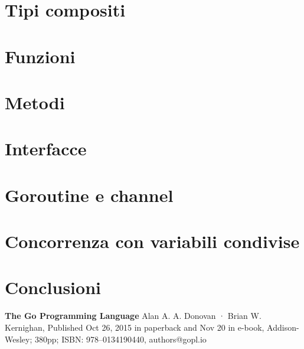 \documentclass{Configuration_Files/UniBs_thesis}
\begin{document}
    \chapter{Tipi compositi}
    \label{ch:tipi_compositi}%
    


    \chapter{Funzioni}
    \label{ch:funzioni}%
    


    \chapter{Metodi}
    \label{ch:metodi}%
    


    \chapter{Interfacce}
    \label{ch:interfacce}%
    


    \chapter{Goroutine e channel}
    \label{ch:goroutine_e_channel}%
    


    \chapter{Concorrenza con variabili condivise}
    \label{ch:concorrenza_con_variabili_condivise}%
    


    \chapter{Conclusioni}
    \label{ch:conclusioni}%
    
    \begin{thebibliography}{100}
         \textbf{The Go Programming Language} Alan A. A. Donovan · Brian W. Kernighan, Published Oct 26, 2015 in paperback and Nov 20 in e-book, Addison-Wesley;
        380pp;
        ISBN: 978--0134190440, authors@gopl.io
    \end{thebibliography}
\end{document}
